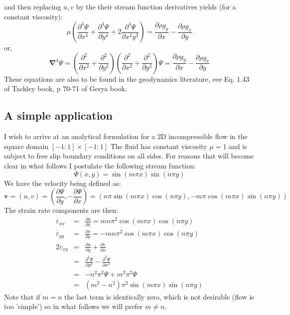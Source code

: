 and then replacing $u,v$ by the their stream function derivatives yields (for a constant viscosity):
\begin{equation}
\mu \left(\frac{\partial^4 \Psi}{\partial x^4} + 
\frac{\partial^4 \Psi}{\partial y^4} + 
2\frac{\partial^4 \Psi}{\partial x^2y^2} \right)
=
\frac{\partial \rho g_y}{\partial x} - \frac{\partial \rho g_x}{\partial y}   
\end{equation}
or, 
\begin{equation}
{\bm \nabla}^4 \Psi 
=
\left(\frac{\partial^2 }{\partial x^2} + \frac{\partial^2 }{\partial y^2} \right) 
\left(\frac{\partial^2 }{\partial x^2} + \frac{\partial^2 }{\partial y^2} \right) \Psi
=
\frac{\partial \rho g_y}{\partial x} - \frac{\partial \rho g_x}{\partial y}   
\end{equation}
These equations are also to be found in the geodynamics literature, eee Eq. 1.43 of Tackley book, p 70-71 of Gerya book.

\subsection*{A simple application}
I wish to arrive at an analytical formulation for a 2D incompressible flow in the square domain $[-1:1]\times[-1:1]$
The fluid has constant viscosity $\mu=1$ and is subject to free slip boundary conditions on all sides.
For reasons that will become clear in what follows I postulate the following stream function:
\begin{equation}
\Psi(x,y)=\sin( m \pi x)\sin( n\pi y)
\end{equation}
We have the velocity being defined as:
\begin{equation}
{\bm v} = (u,v) = \left( \frac{\partial \Psi}{\partial y},-\frac{\partial \Psi}{\partial x} \right) 
= (n \pi \sin (m\pi x)\cos(n\pi y),-m\pi \cos(m\pi x)\sin (n\pi y))
\end{equation}
The strain rate components are then:
\begin{eqnarray}
\dot\varepsilon_{xx} &=&  \frac{\partial u}{\partial x} = mn \pi^ 2  \cos (m\pi x)\cos(n\pi y)   \\
\dot\varepsilon_{yy} &=&  \frac{\partial v}{\partial y} = -mn \pi^ 2  \cos (m\pi x)\cos(n\pi y)  \\
2\dot\varepsilon_{xy} &=&  \frac{\partial u}{\partial y} +  \frac{\partial v}{\partial x}    \\
&=&  \frac{\partial^2 \Psi}{\partial y^2} -  \frac{\partial^2 \Psi}{\partial x^2}    \\
&=& -n^2\pi^2 \Psi + m^2 \pi^2 \Psi \\
&=& (m^2-n^2) \pi^2   \sin( m \pi x)\sin( n\pi y)
\end{eqnarray}
Note that if $m=n$ the last term is identically zero, which is not desirable 
(flow is too 'simple')
so in what follows we will prefer $m\neq n$.

